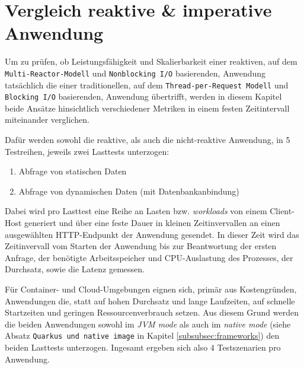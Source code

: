 \section {Vergleich reaktive \& imperative Anwendung}
\label{section:vergleich_reaktiv_imperativ}
Um zu prüfen, ob Leistungsfähigkeit und Skalierbarkeit einer reaktiven, auf dem \newline
\verb|Multi-Reactor-Modell| und \verb|Nonblocking I/O| basierenden,
Anwendung tatsächlich die einer traditionellen, auf dem \verb|Thread-per-Request Modell| und \verb|Blocking I/O| basierenden, Anwendung übertrifft, werden in
diesem Kapitel beide Ansätze hinsichtlich verschiedener Metriken in einem festen Zeitintervall miteinander verglichen.

Dafür werden sowohl die reaktive, als auch die nicht-reaktive Anwendung, in 5 Testreihen, jeweils zwei Lasttests unterzogen:
\begin{enumerate}
    \item Abfrage von statischen Daten
    \item Abfrage von dynamischen Daten (mit Datenbankanbindung)
\end{enumerate}
Dabei wird pro Lasttest eine Reihe an Lasten bzw. \textit{workloads} von einem Client-Host generiert und über eine feste Dauer in kleinen Zeitinvervallen
an einen ausgewählten HTTP-Endpunkt der Anwendung gesendet.
In dieser Zeit wird das Zeitinvervall vom Starten der Anwendung bis zur Beantwortung der ersten Anfrage,
der benötigte Arbeitsspeicher und CPU-Auslastung des Prozesses, der Durchsatz, sowie die Latenz gemessen.

Für Container- und Cloud-Umgebungen eignen sich, primär aus Kostengründen, Anwendungen die, statt auf hohen Durchsatz und lange Laufzeiten, auf
schnelle Startzeiten und geringen Ressourcenverbrauch setzen.
Aus diesem Grund werden die beiden Anwendungen sowohl im \textit{JVM mode} als auch im \textit{native mode}
(siehe Absatz \verb|Quarkus und native image| in Kapitel \ref{subsubsec:frameworks})
den beiden Lasttests unterzogen. Ingesamt ergeben sich also 4 Testszenarien pro Anwendung.

